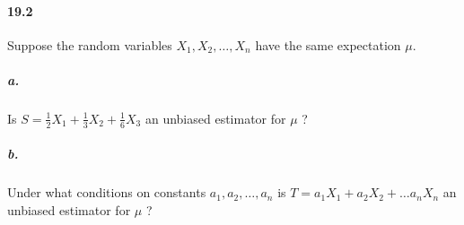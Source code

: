 \documentclass{article} %
\begin{document}
%
\newpage
\paragraph*{19.2} Suppose the random variables $X_1, X_2, \ldots, X_n$ have the same expectation $\mu$. 
\subparagraph*{a.} Is $S=\frac{1}{2}X_1 + \frac{1}{3}X_2 + \frac{1}{6}X_3$ an unbiased estimator for $\mu$ ?
\subparagraph*{b.} Under what conditions on constants $a_1, a_2, \ldots, a_n$ is $T=a_1X_1 + a_2 X_2 + \ldots a_nX_n$ an unbiased estimator for $\mu$ ?
%
%
\end{document}
